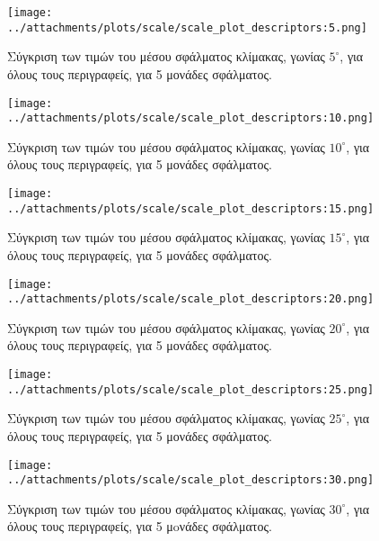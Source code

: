  \begin{figure}[ht!]
\begin{minipage}[b]{1.0\linewidth}
\centering
\texttt{[image: ../attachments/plots/scale/scale\_plot\_descriptors:5.png]}
\caption{Σύγκριση των τιμών του μέσου σφάλματος κλίμακας, γωνίας $5^{\circ}$, για όλους τους περιγραφείς, για 5 μονάδες σφάλματος.}
\label{fig:plot_angle_des_5_high}
\end{minipage}
\end{figure} 
\begin{figure}[ht!]
\begin{minipage}[b]{1.0\linewidth}
\centering
\texttt{[image: ../attachments/plots/scale/scale\_plot\_descriptors:10.png]}
\caption{Σύγκριση των τιμών του μέσου σφάλματος κλίμακας, γωνίας $10^{\circ}$, για όλους τους περιγραφείς, για 5 μονάδες σφάλματος.}
\label{fig:plot_angle_des_10_high}
\end{minipage}
\end{figure} 
 
 
\newpage

\begin{figure}[ht!]
\begin{minipage}[b]{1.0\linewidth}
\centering
\texttt{[image: ../attachments/plots/scale/scale\_plot\_descriptors:15.png]}
\caption{Σύγκριση των τιμών του μέσου σφάλματος κλίμακας, γωνίας $15^{\circ}$, για όλους τους περιγραφείς, για 5 μονάδες σφάλματος.}
\label{fig:plot_angle_des_15_high}
\end{minipage}
\end{figure} 
\begin{figure}[ht!]
\begin{minipage}[b]{1.0\linewidth}
\centering
\texttt{[image: ../attachments/plots/scale/scale\_plot\_descriptors:20.png]}
\caption{Σύγκριση των τιμών του μέσου σφάλματος κλίμακας, γωνίας $20^{\circ}$, για όλους τους περιγραφείς, για 5 μονάδες σφάλματος.}
\label{fig:plot_angle_des_20_high}
\end{minipage}

 \end{figure} 
 
 \newpage
 
 \begin{figure}[ht!]
\begin{minipage}[b]{1.0\linewidth}
\centering
\texttt{[image: ../attachments/plots/scale/scale\_plot\_descriptors:25.png]}
\caption{Σύγκριση των τιμών του μέσου σφάλματος κλίμακας, γωνίας $25^{\circ}$, για όλους τους περιγραφείς, για 5 μονάδες σφάλματος.}
\label{fig:plot_angle_des_25_high}
\end{minipage}
\end{figure} 
\begin{figure}[ht!]
\begin{minipage}[b]{1.0\linewidth}
\centering
\texttt{[image: ../attachments/plots/scale/scale\_plot\_descriptors:30.png]}
\caption{Σύγκριση των τιμών του μέσου σφάλματος κλίμακας, γωνίας $30^{\circ}$, για όλους τους περιγραφείς, για 5 μoνάδες σφάλματος.}
\label{fig:plot_angle_des_30_high}
\end{minipage}

 \end{figure} 
 

